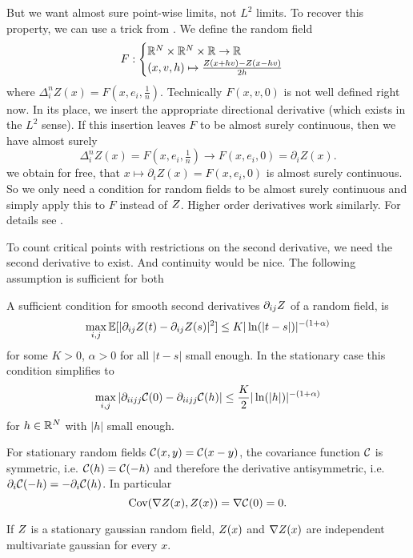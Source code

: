 But we want almost sure point-wise limits, not \(L^2\) limits. To recover this
property, we can use a trick from 
\textcite[Sec.~1.4.2]{adlerRandomFieldsGeometry2007}. We define the random field
\[
	F: \begin{cases}
		\mathbb{R}^N \times \mathbb{R}^N \times \mathbb{R} \to \mathbb{R}\\
		(x,v,h)	\mapsto \frac{Z(x+hv)-Z(x-hv)}{2h}
	\end{cases}
\]
where \(\Delta_i^n Z(x) = F(x,e_i,\tfrac1n)\). Technically \(F(x,v,0)\) is not
well defined right now. In its place, we insert the appropriate directional
derivative (which exists in the \(L^2\) sense). If this insertion leaves \(F\)
to be almost surely continuous, then we have almost surely
\[
	\Delta_i^n Z(x)=F(x,e_i,\tfrac1n)\to F(x, e_i, 0)= \partial_i Z(x).
\]
we obtain for free, that \(x\mapsto \partial_i Z(x) = F(x,e_i,0)\) is almost
surely continuous. So we only need a condition for random fields to be almost
surely continuous and simply apply this to \(F\) instead of \(Z\). Higher
order derivatives work similarly. For details see
\textcite[Sec.~1.4.2]{adlerRandomFieldsGeometry2007}.

To count critical points with restrictions on the second derivative, we need
the second derivative to exist. And continuity would be nice. The following
assumption is sufficient for both \parencite*[cf.
Theorem~1.4.2]{adlerRandomFieldsGeometry2007}

\begin{assumption}\label{assmpt: smoothness assumption}
	A sufficient condition for smooth second derivatives \(\partial_{ij}	Z\)
	of a random field, is
	\begin{equation}\label{eq: sufficient for continuous second derivative}
		\max_{i,j}\mathbb{E}[|\partial_{ij}Z(t) - \partial_{ij}Z(s)|^2]
		\le K |\ln(|t-s|)|^{-(1+\alpha)}
	\end{equation}
	for some \(K>0\), \(\alpha>0\) for all \(|t-s|\) small enough.
	In the stationary case this condition simplifies to
	\[
		\max_{i,j}|\partial_{ii jj}\mathcal{C}(0)
		-\partial_{ii jj}\mathcal{C}(h)| \le \frac{K}2 |\ln(|h|)|^{-(1+\alpha)}
	\]
	for \(h\in\mathbb{R}^N\) with \(|h|\) small enough.
\end{assumption}


\begin{remark}\label{rem: covariance uncorrelated}
	For stationary random fields \(\mathcal{C}(x,y)=\mathcal{C}(x-y)\), the covariance
	function \(\mathcal{C}\) is symmetric, i.e. \(\mathcal{C}(h)=\mathcal{C}(-h)\)
	and therefore the derivative antisymmetric, i.e.
	\(\partial_i\mathcal{C}(-h)=-\partial_i\mathcal{C}(h)\). In particular
	\begin{equation*}
		\operatorname{Cov}(\nabla Z(x), Z(x)) = \nabla \mathcal{C}(0)=0.
	\end{equation*}
\end{remark}
\begin{corollary} \label{cor: uncorr leads to indep in gaussian case}
	If \(Z\) is a stationary gaussian random field, \(Z(x)\) and
	\(\nabla Z(x)\) are independent multivariate gaussian for every \(x\).
\end{corollary}

